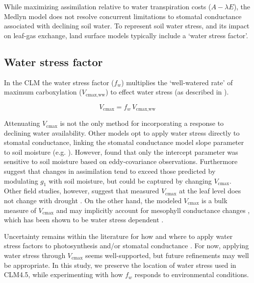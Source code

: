 \documentclass[draft,linenumbers]{agujournal}
\begin{document}
    While maximizing assimilation relative to water transpiration costs ($A-\lambda E$), the Medlyn model does not 
    resolve concurrent limitations to stomatal conductance associated with declining soil water. 
    To represent soil water stress, and its impact on leaf-gas exchange, land surface models typically include a `water stress factor'. 

    
\subsection{Water stress factor}

    In the CLM the water stress factor ($f_w$) multiplies the `well-watered rate' of maximum carboxylation ($V_{\text{cmax,ww}}$) to effect water stress (as described in \citet{oleson2013}). 
    
    \begin{equation}
    V_{\text{cmax}} = f_w\, V_{\text{cmax,ww}} 
    \end{equation}

    Attenuating $V_{\text{cmax}}$ is not the only method for incorporating a response to declining water availability.
    Other models opt to apply water stress directly to stomatal conductance, linking the stomatal conductance model slope parameter to soil moisture 
    (e.g. \cite{dekauwe2015}).
     However, \cite{lin2018} found that only the intercept parameter was sensitive to soil moisture based on eddy-covariance observations.
    Furthermore \cite{zhou2013} suggest that changes in assimilation tend to exceed those predicted by modulating $g_1$ with soil moisture, but could be captured by changing $V_{\text{cmax}}$.
    Other field studies, however, suggest that measured $V_{\text{cmax}}$ at the leaf level does not change with drought \citep{flexas2004}. 
    On the other hand, the modeled $V_{\text{cmax}}$ is a bulk measure of $V_{\text{cmax}}$ and may implicitly account for mesophyll conductance changes \citep{rogers2017}, which has been shown to be water stress dependent \citep{flexas2012}.

    Uncertainty remains within the literature for how and where to apply water stress factors to photosynthesis and/or stomatal conductance 
    \citep{zhou2013,novick2016a,sperry2015}.
    For now, applying water stress through $V_{\text{cmax}}$ seems well-supported, but future refinements may well be appropriate.
    In this study, we preserve the location of water stress used in CLM4.5, while experimenting with how $f_w$ responds to environmental conditions.
    
\end{document}
